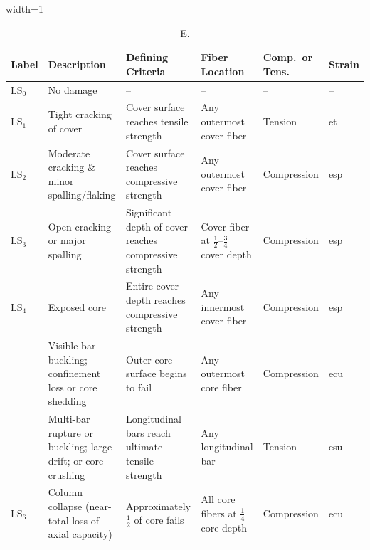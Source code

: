 \begin{table}[H]
\centering
\caption{E.}
\begin{adjustbox}{width=1\textwidth}
\renewcommand{\arraystretch}{1.5}
\begin{tabular}{>{\centering\arraybackslash}m{1.2cm}
                 m{4.2cm}
                 m{5.2cm}
                 m{3.4cm}
                 >{\centering\arraybackslash}m{2.4cm}
                 >{\centering\arraybackslash}m{1.4cm}}
\toprule
\textbf{Label} & \textbf{Description} & \textbf{Defining Criteria} &
\textbf{Fiber Location} & \textbf{Comp.\ or Tens.} & \textbf{Strain} \\
\midrule

\textbf{$\mathrm{LS}_{0}$} & \small No damage & \small -- & \small -- & \small -- & \small -- \\
\textbf{$\mathrm{LS}_{1}$} & \small Tight cracking of cover &
  \small Cover surface reaches tensile strength &
  \small Any outermost cover fiber & \small Tension & \small \gls{et} \\
\textbf{$\mathrm{LS}_{2}$} & \small Moderate cracking \& minor spalling/flaking &
  \small Cover surface reaches compressive strength &
  \small Any outermost cover fiber & \small Compression & \small \gls{esp} \\
\textbf{$\mathrm{LS}_{3}$} & \small Open cracking or major spalling &
  \small Significant depth of cover reaches compressive strength &
  \small Cover fiber at $\tfrac{1}{2}$--$\tfrac{3}{4}$ cover depth & \small Compression & \small \gls{esp} \\
\textbf{$\mathrm{LS}_{4}$} & \small Exposed core &
  \small Entire cover depth reaches compressive strength &
  \small Any innermost cover fiber & \small Compression & \small \gls{esp} \\
\multirow{2}{*}{\textbf{$\mathrm{LS}_{5}$}} &
  \small Visible bar buckling; confinement loss or core shedding &
  \small Outer core surface begins to fail &
  \small Any outermost core fiber & \small Compression & \small \gls{ecu} \\
& \small Multi-bar rupture or buckling; large drift; or core crushing &
  \small Longitudinal bars reach ultimate tensile strength &
  \small Any longitudinal bar & \small Tension & \small \gls{esu} \\
\textbf{$\mathrm{LS}_{6}$} & \small Column collapse (near-total loss of axial capacity) &
  \small Approximately $\tfrac{1}{2}$ of core fails &
  \small All core fibers at $\tfrac{1}{4}$ core depth & \small Compression & \small \gls{ecu} \\
\bottomrule
\end{tabular}
\end{adjustbox}
\label{tab:DS-E}
\end{table}

